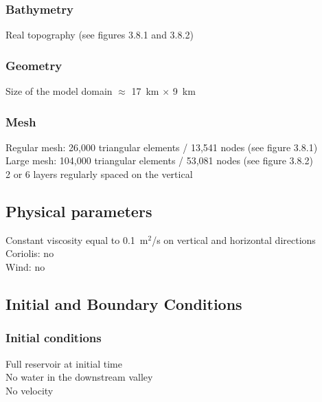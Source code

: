 \subsubsection{Bathymetry}
%
Real topography (see figures 3.8.1 and 3.8.2)
%
\subsubsection{Geometry}
%
Size of the model domain $\approx$ 17~km $\times$ 9~km
%
\subsubsection{Mesh}
%
Regular mesh: 26,000 triangular elements / 13,541 nodes
(see figure 3.8.1)\\
Large mesh: 104,000 triangular elements / 53,081 nodes
(see figure 3.8.2)\\
2 or 6 layers regularly spaced on the vertical
%
%
%
\subsection{Physical parameters}
%
Constant viscosity equal to 0.1~m$^2$/s on vertical and horizontal
directions\\
Coriolis: no\\
Wind: no
%
%
%
%
%
%
\subsection{Initial and Boundary Conditions}
%
\subsubsection{Initial conditions}
%
Full reservoir at initial time\\
No water in the downstream valley\\
No velocity
%
